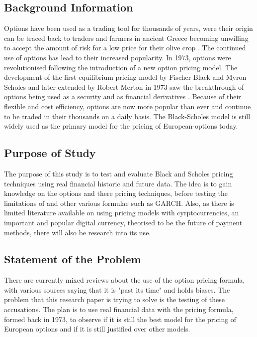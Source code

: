 \documentclass[12pt]{article}
\begin{document}
\subsection{Background Information}  \label{Background Information}
Options have been used as a trading tool for thousands of years, were their origin can be traced back to traders and farmers in ancient Greece becoming unwilling to accept the amount of risk for a low price for their olive crop \citep{Arnold}. The continued use of options has lead to their increased popularity. In 1973, options were revolutionised following the introduction of a new option pricing model. The development of the first equilibrium pricing model by Fischer Black and Myron Scholes and later extended by Robert Merton in 1973 saw the breakthrough of options being used as a security and as financial derivatives \citep{BSReport}. Because of their flexible and cost efficiency, options are now more popular than ever and continue to be traded in their thousands on a daily basis. The Black-Scholes model is still widely used as the primary model for the pricing of European-options today.

\subsection{Purpose of Study}
The purpose of this study is to test and evaluate Black and Scholes pricing techniques using real financial historic and future data. The idea is to gain knowledge on the options and there pricing techniques, before testing the limitations of \cite{BSReport} and other various formulae such as GARCH. Also, as there is limited literature available on using pricing models with cyrptocurrencies, an important and popular digital currency, theorised to be the future of payment methods, there will also be research into its use.  

\subsection{Statement of the Problem}
There are currently mixed reviews about the use of the \cite{BSReport} option pricing formula, with various sources saying that it is "past its time" and holds biases. The problem that this research paper is trying to solve is the testing of these accusations. The plan is to use real financial data with the pricing formula, formed back in 1973, to observe if it is still the best model for the pricing of European options and if it is still justified over other models.
\end{document}
